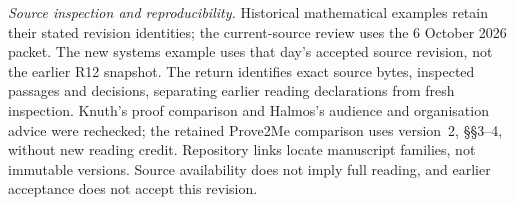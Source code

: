 \noindent\small\textit{Source inspection and reproducibility.}
Historical mathematical examples retain their stated revision identities;
the current-source review uses the 6 October 2026 packet. The new systems
example uses that day's accepted source revision, not the earlier R12 snapshot.
The return identifies exact source bytes, inspected passages and decisions,
separating earlier reading declarations from fresh inspection. Knuth's proof
comparison and Halmos's audience and organisation advice were rechecked;
the retained Prove2Me comparison uses version~2, \S\S3--4, without new reading
credit. Repository links locate manuscript families, not immutable versions.
Source availability does not imply full reading, and earlier acceptance does
not accept this revision.
